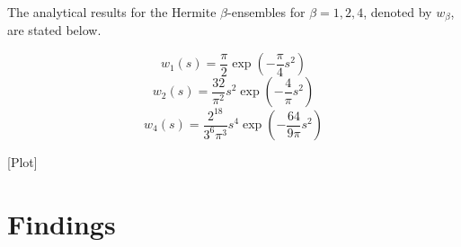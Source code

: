 The analytical results for the Hermite $\beta$-ensembles for $\beta = 1, 2, 4$, denoted by $w_\beta$, are stated below.

$$w_1(s) = \frac{\pi}{2} \exp(-\frac{\pi}{4}s^2)$$
$$w_2(s) = \frac{32}{\pi^2} s^2 \exp(-\frac{4}{\pi}s^2)$$
$$w_4(s) = \frac{2^{18}}{3^{6}\pi^3} s^4 \exp(-\frac{64}{9\pi}s^2)$$

[Plot]


\section{Findings}
